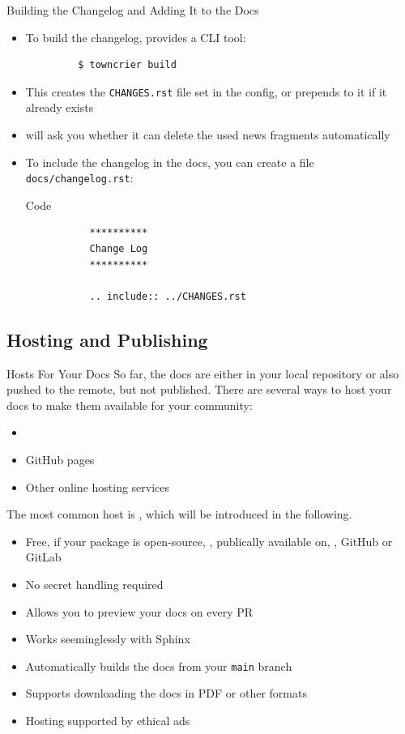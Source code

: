 \begin{frame}[fragile]{Building the Changelog and Adding It to the Docs}
  \begin{itemize}
    \setlength{\itemsep}{1em}
    \item To build the changelog, \tc{} provides a CLI tool:
      \begin{verbatim}
         $ towncrier build
      \end{verbatim}
    \item This creates the \texttt{CHANGES.rst} file set in the config, or prepends to it
      if it already exists
    \item \tc{} will ask you whether it can delete the used news fragments automatically
    \item To include the changelog in the docs, you can create a file \texttt{docs/changelog.rst}:
      \begin{block}{Code}
        \begin{verbatim}
           **********
           Change Log
           **********

           .. include:: ../CHANGES.rst
         \end{verbatim}
      \end{block}
  \end{itemize}
\end{frame}

\subsection{Hosting and Publishing}
\begin{frame}[fragile]{Hosts For Your Docs}
   So far, the docs are either in your local repository or also pushed to the remote,
   but not published. There are several ways to host your docs to make them available
   for your community:
   \begin{itemize}
    \item \rtd
    \item GitHub pages
    \item Other online hosting services
   \end{itemize}

   The most common host is \rtd, which will be introduced in the following.
\end{frame}
\begin{frame}[fragile]{\rtd}
  \begin{itemize}
    \setlength{\itemsep}{1.5em}
    \item Free, if your package is open-source, \ie, publically available on, \eg, GitHub or GitLab
    \item No secret handling required
    \item Allows you to preview your docs on every PR
    \item Works seeminglessly with Sphinx
    \item Automatically builds the docs from your \texttt{main} branch
    \item Supports downloading the docs in PDF or other formats
    \item Hosting supported by ethical ads
  \end{itemize}
\end{frame}

